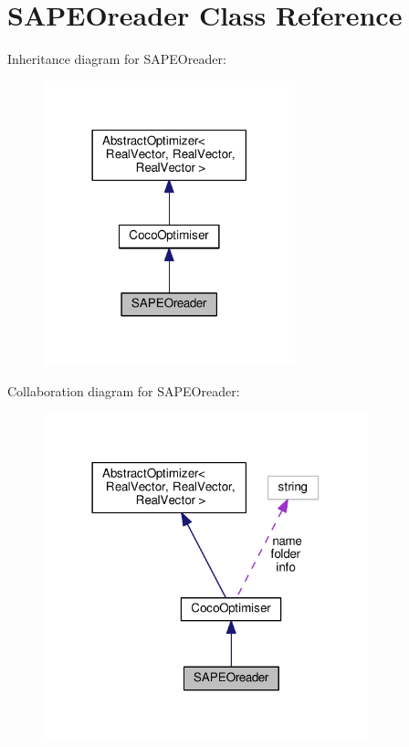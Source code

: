 \hypertarget{classSAPEOreader}{}\section{S\+A\+P\+E\+Oreader Class Reference}
\label{classSAPEOreader}


Inheritance diagram for S\+A\+P\+E\+Oreader\+:\nopagebreak
\begin{figure}[H]
\begin{center}
\leavevmode
\includegraphics[width=206pt]{classSAPEOreader__inherit__graph}
\end{center}
\end{figure}


Collaboration diagram for S\+A\+P\+E\+Oreader\+:\nopagebreak
\begin{figure}[H]
\begin{center}
\leavevmode
\includegraphics[width=266pt]{classSAPEOreader__coll__graph}
\end{center}
\end{figure}
